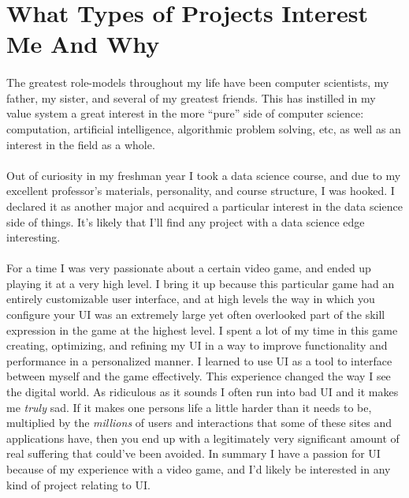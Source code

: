 \documentclass[12pt]{article}
\begin{document}
\section*{What Types of Projects Interest Me And Why}

\paragraph{}

The greatest role-models throughout my life have been computer scientists, my father, my sister, and several of my greatest friends. This has instilled in my value system a great interest in the more ``pure'' side of computer science: computation, artificial intelligence, algorithmic problem solving, etc, as well as an interest in the field as a whole. 

\paragraph{}

Out of curiosity in my freshman year I took a data science course, and due to my excellent professor's materials, personality, and course structure, I was hooked. I declared it as another major and acquired a particular interest in the data science side of things. It's likely that I'll find any project with a data science edge interesting. 

\paragraph{}

For a time I was very passionate about a certain video game, and ended up playing it at a very high level. I bring it up because this particular game had an entirely customizable user interface, and at high levels the way in which you configure your UI was an extremely large yet often overlooked part of the skill expression in the game at the highest level. I spent a lot of my time in this game creating, optimizing, and refining my UI in a way to improve functionality and performance in a personalized manner. I learned to use UI as a tool to interface between myself and the game effectively. This experience changed the way I see the digital world. As ridiculous as it sounds I often run into bad UI and it makes me \textit{truly} sad. If it makes one persons life a little harder than it needs to be, multiplied by the \textit{millions} of users and interactions that some of these sites and applications have, then you end up with a legitimately very significant amount of real suffering that could've been avoided. In summary I have a passion for UI because of my experience with a video game, and I'd likely be interested in any kind of project relating to UI.
\end{document}
